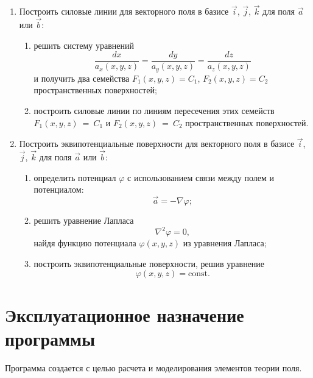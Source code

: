 \documentclass[14pt,a4paper,final]{extreport}
\begin{document}
\begin{enumerate}[label=\arabic*.]
	\item Построить силовые линии для векторного поля в базисе \( \vec i \), \( \vec j \), \( \vec k \) для поля \( \vec a \) или \( \vec b \):
	
	\begin{enumerate}[label=\theenumi\arabic*]
		\item решить систему уравнений \[ \frac{dx}{a_x(x, y, z)} = \frac{dy}{a_y(x, y, z)} = \frac{dz}{a_z(x, y, z)} \]  и получить два семейства \( F_1(x, y, z) = C_1 \), \( F_2(x, y, z) = C_2 \) пространственных поверхностей;
		
		\item построить силовые линии по линиям пересечения этих семейств \( F_1(x, y, z)~=~C_1 \) и \( F_2(x, y, z)~=~C_2 \) пространственных поверхностей.
	\end{enumerate}
	
	\item Построить эквипотенциальные поверхности для векторного поля в базисе \( \vec i \), \( \vec j \), \( \vec k \) для поля \( \vec a \) или \( \vec b \):
	
	\begin{enumerate}[label=\theenumi\arabic*]
		\item определить потенциал \( \varphi \) с использованием связи между полем и потенциалом: \[ \vec a = -\nabla \varphi ;\]
		
		\item решить уравнение Лапласа \[ \nabla^2 \varphi = 0, \]найдя функцию потенциала \( \varphi (x, y, z) \) из уравнения Лапласа;
\pagebreak %
		
		\item построить эквипотенциальные поверхности, решив уравнение \[ \varphi (x, y, z) = \mathrm{const} .\]
	\end{enumerate}
\end{enumerate}

\section{ Эксплуатационное назначение программы}
Программа создается с целью расчета и моделирования элементов теории поля.
\end{document}

